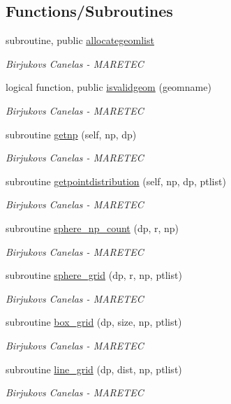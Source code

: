 \subsection*{Functions/\+Subroutines}
\begin{DoxyCompactItemize}
\item 
subroutine, public \hyperlink{namespacegeometry_a17652db20fde3f883b4fc778e0e6cdda}{allocategeomlist}
\begin{DoxyCompactList}\small\item\em Birjukovs Canelas -\/ M\+A\+R\+E\+T\+EC \end{DoxyCompactList}\item 
logical function, public \hyperlink{namespacegeometry_a56488a00edf7ba4e670ceffd5c36f13f}{isvalidgeom} (geomname)
\begin{DoxyCompactList}\small\item\em Birjukovs Canelas -\/ M\+A\+R\+E\+T\+EC \end{DoxyCompactList}\item 
subroutine \hyperlink{namespacegeometry_ad14d7800ac13b9a6722ac96b06ce94c9}{getnp} (self, np, dp)
\begin{DoxyCompactList}\small\item\em Birjukovs Canelas -\/ M\+A\+R\+E\+T\+EC \end{DoxyCompactList}\item 
subroutine \hyperlink{namespacegeometry_a726dae6e63f052138bd3346de439fbc4}{getpointdistribution} (self, np, dp, ptlist)
\begin{DoxyCompactList}\small\item\em Birjukovs Canelas -\/ M\+A\+R\+E\+T\+EC \end{DoxyCompactList}\item 
subroutine \hyperlink{namespacegeometry_a4f070ef95bffe3bbb21bd251ae5ca6c7}{sphere\+\_\+np\+\_\+count} (dp, r, np)
\begin{DoxyCompactList}\small\item\em Birjukovs Canelas -\/ M\+A\+R\+E\+T\+EC \end{DoxyCompactList}\item 
subroutine \hyperlink{namespacegeometry_a9629040285de7053d42f434333528702}{sphere\+\_\+grid} (dp, r, np, ptlist)
\begin{DoxyCompactList}\small\item\em Birjukovs Canelas -\/ M\+A\+R\+E\+T\+EC \end{DoxyCompactList}\item 
subroutine \hyperlink{namespacegeometry_ab7f40c137db819829d3110dac77a2977}{box\+\_\+grid} (dp, size, np, ptlist)
\begin{DoxyCompactList}\small\item\em Birjukovs Canelas -\/ M\+A\+R\+E\+T\+EC \end{DoxyCompactList}\item 
subroutine \hyperlink{namespacegeometry_a7d580229bc67448e6389d0beef0c04cb}{line\+\_\+grid} (dp, dist, np, ptlist)
\begin{DoxyCompactList}\small\item\em Birjukovs Canelas -\/ M\+A\+R\+E\+T\+EC \end{DoxyCompactList}\end{DoxyCompactItemize}
